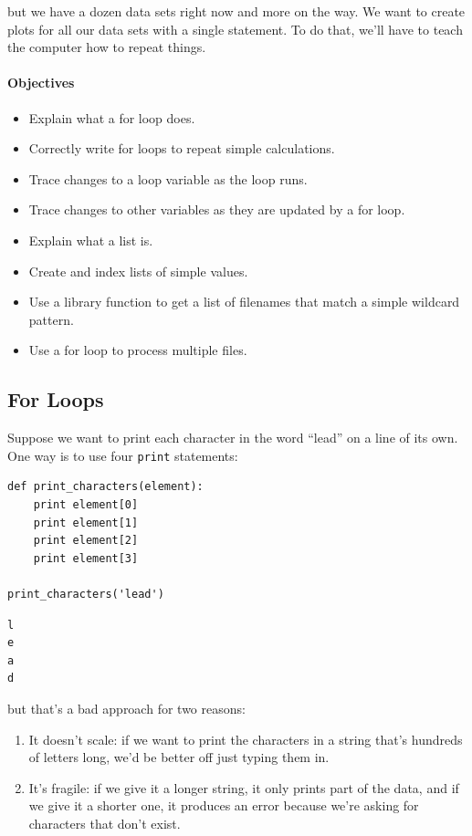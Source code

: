\documentclass[]{book}
\begin{document}
but we have a dozen data sets right now and more on the way. We want to
create plots for all our data sets with a single statement. To do that,
we'll have to teach the computer how to repeat things.

\mbox{}\paragraph{Objectives}

\begin{itemize}
\item
  Explain what a for loop does.
\item
  Correctly write for loops to repeat simple calculations.
\item
  Trace changes to a loop variable as the loop runs.
\item
  Trace changes to other variables as they are updated by a for loop.
\item
  Explain what a list is.
\item
  Create and index lists of simple values.
\item
  Use a library function to get a list of filenames that match a simple
  wildcard pattern.
\item
  Use a for loop to process multiple files.
\end{itemize}

\subsection{For Loops}

Suppose we want to print each character in the word ``lead'' on a line
of its own. One way is to use four \texttt{print} statements:

\begin{verbatim}
def print_characters(element):
    print element[0]
    print element[1]
    print element[2]
    print element[3]

print_characters('lead')
\end{verbatim}

\begin{verbatim}
l
e
a
d
\end{verbatim}

but that's a bad approach for two reasons:

\begin{enumerate}
\item
  It doesn't scale: if we want to print the characters in a string
  that's hundreds of letters long, we'd be better off just typing them
  in.
\item
  It's fragile: if we give it a longer string, it only prints part of
  the data, and if we give it a shorter one, it produces an error
  because we're asking for characters that don't exist.
\end{enumerate}
\end{document}

